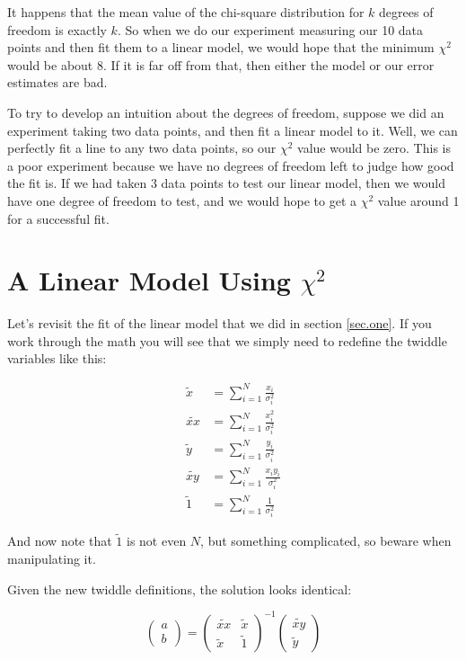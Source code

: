 \documentclass[letterpaper,12pt]{article}
\begin{document}
It happens that the mean value of the chi-square distribution for $k$ degrees of freedom is exactly $k$. So when we do our experiment measuring our 10 data points and then fit them to a linear model, we would hope that the minimum $\chi^2$ would be about 8. If it is far off from that, then either the model or our error estimates are bad.

To try to develop an intuition about the degrees of freedom, suppose we did an experiment taking two data points, and then fit a linear model to it. Well, we can perfectly fit a line to any two data points, so our $\chi^2$ value would be zero. This is a poor experiment because we have no degrees of freedom left to judge how good the fit is. If we had taken 3 data points to test our linear model, then we would have one degree of freedom to test, and we would hope to get a $\chi^2$ value around 1 for a successful fit.

\section{A Linear Model Using $\chi^2$}
Let's revisit the fit of the linear model that we did in section \ref*{sec.one}. If you work through the math you will see that we simply need to redefine the twiddle variables like this:

\begin{equation}
\begin{aligned}
\label{twiddle2}
\widetilde{x}&=\sum_{i=1}^N \frac{x_i}{\sigma_i^2}\\
\widetilde{xx}&=\sum_{i=1}^N \frac{x_i^2}{\sigma_i^2}\\
\widetilde{y}&=\sum_{i=1}^N \frac{y_i}{\sigma_i^2}\\
\widetilde{xy}&=\sum_{i=1}^N \frac{x_i y_i}{\sigma_i^2}\\
\widetilde{1}&=\sum_{i=1}^N \frac{1}{\sigma_i^2}
\end{aligned}
\end{equation}

And now note that $\widetilde{1}$ is not even $N$, but something complicated, so beware when manipulating it.

Given the new twiddle definitions, the solution looks identical:

\begin{equation} \label{eq.linear.solution}
\begin{pmatrix}
a \\
b
\end{pmatrix} =
\begin{pmatrix}
\widetilde{xx} & \widetilde{x} \\
\widetilde{x} & \widetilde{1}
\end{pmatrix} ^{-1}
\begin{pmatrix}
\widetilde{xy}  \\
\widetilde{y}
\end{pmatrix}
\end{equation}
\end{document}
